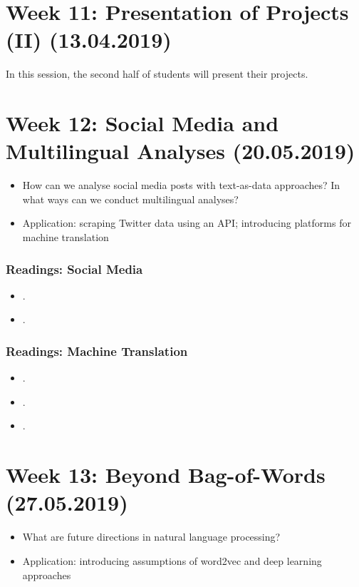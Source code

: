 \documentclass[abstract=on,parskip=full,headings=standardclasses,fontsize=11pt,paper=a4]{scrartcl}
\begin{document}
\section{Week 11: Presentation of Projects (II) (13.04.2019)}

In this session, the second half of students will present their projects. 



\section{Week 12: Social Media and Multilingual Analyses (20.05.2019)}

\begin{itemize}
\item How can we analyse social media posts with text-as-data approaches? In what ways can we conduct multilingual analyses? 
\item Application: scraping Twitter data using an API; introducing platforms for machine translation
\end{itemize}

\subsubsection*{Readings: Social Media}
\begin{itemize}
\item {}.
\item {}.
\end{itemize}

\subsubsection*{Readings: Machine Translation}
\begin{itemize}
\item {}.
\item {}.
\item {}.
\end{itemize}


\section{Week 13: Beyond Bag-of-Words (27.05.2019)}


\begin{itemize}
\item What are future directions in natural language processing?
\item Application: introducing assumptions of word2vec and deep learning approaches
\end{itemize}
\end{document}

